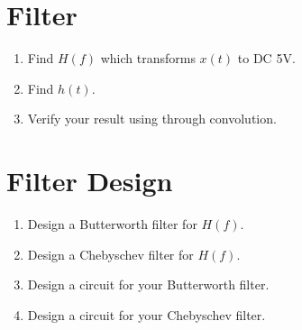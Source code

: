 \documentclass[journal,12pt,twocolumn]{IEEEtran}
\renewcommand\thesection{\arabic{section}}
\begin{document}
	\section{Filter}

\begin{enumerate}[label=\thesection.\arabic*
	,ref=\thesection.\theenumi]
	\item Find $H(f)$ which transforms $x(t)$ to DC 5V.
	\item Find $h(t)$.
	\item Verify your result using  through convolution.
	\end{enumerate}

\section{Filter Design}
\begin{enumerate}[label=\thesection.\arabic*
,ref=\thesection.\theenumi]
\item Design a Butterworth filter for $H(f)$.
\item Design a Chebyschev filter for $H(f)$.
\item Design a circuit for your Butterworth filter.
\item Design a circuit for your Chebyschev filter.
\end{enumerate}
\end{document}
